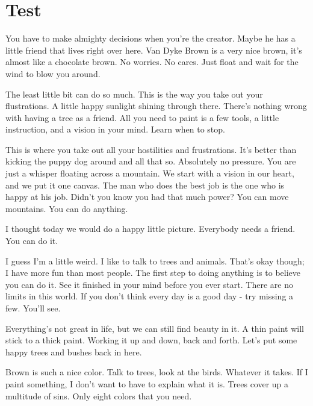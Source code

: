 \section{Test}
You have to make almighty decisions when you're the creator. Maybe he has a little friend that lives right over here. Van Dyke Brown is a very nice brown, it's almost like a chocolate brown. No worries. No cares. Just float and wait for the wind to blow you around.

The least little bit can do so much. This is the way you take out your flustrations. A little happy sunlight shining through there. There's nothing wrong with having a tree as a friend. All you need to paint is a few tools, a little instruction, and a vision in your mind. Learn when to stop.

This is where you take out all your hostilities and frustrations. It's better than kicking the puppy dog around and all that so. Absolutely no pressure. You are just a whisper floating across a mountain. We start with a vision in our heart, and we put it one canvas. The man who does the best job is the one who is happy at his job. Didn't you know you had that much power? You can move mountains. You can do anything.

I thought today we would do a happy little picture. Everybody needs a friend. You can do it.

I guess I'm a little weird. I like to talk to trees and animals. That's okay though; I have more fun than most people. The first step to doing anything is to believe you can do it. See it finished in your mind before you ever start. There are no limits in this world. If you don't think every day is a good day - try missing a few. You'll see.

Everything's not great in life, but we can still find beauty in it. A thin paint will stick to a thick paint. Working it up and down, back and forth. Let's put some happy trees and bushes back in here.

Brown is such a nice color. Talk to trees, look at the birds. Whatever it takes. If I paint something, I don't want to have to explain what it is. Trees cover up a multitude of sins. Only eight colors that you need.

